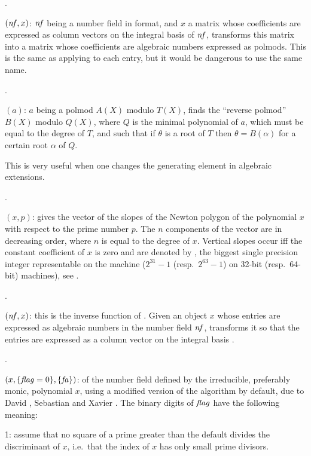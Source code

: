 .

$(\hbox{\it nf\/},x)$: $\hbox{\it nf\/}$ being a number field in
 format, and $x$ a matrix whose coefficients are expressed as
column vectors on the integral basis of $\hbox{\it nf\/}$, transforms this matrix
into a matrix whose coefficients are algebraic numbers expressed as
polmods. This is the same as applying  to each entry, but
it would be dangerous to use the same name.

.

$(a)$: $a$ being a polmod $A(X)$ modulo $T(X)$, finds
the ``reverse polmod'' $B(X)$ modulo $Q(X)$, where $Q$ is the minimal
polynomial of $a$, which must be equal to the degree of $T$, and such that if
$\theta$ is a root of $T$ then $\theta=B(\alpha)$ for a certain root $\alpha$
of $Q$.

This is very useful when one changes the generating element in algebraic
extensions.

.

$(x,p)$: gives the vector of the slopes of the Newton
polygon of the polynomial $x$ with respect to the prime number $p$. The $n$
components of the vector are in decreasing order, where $n$ is equal to the
degree of $x$. Vertical slopes occur iff the constant coefficient of $x$ is
zero and are denoted by , the biggest single precision
integer representable on the machine ($2^{31}-1$ (resp.~$2^{63}-1$) on 32-bit
(resp.~64-bit) machines), see .

.

$(\hbox{\it nf\/},x)$: this is the inverse function of
. Given an object $x$ whose entries are expressed as
algebraic numbers in the number field $\hbox{\it nf\/}$, transforms it so that the
entries are expressed as a column vector on the integral basis
.

.

$(x,\{\hbox{\it f\kern0pt lag\/}=0\},\{\hbox{\it fa\/}\})$:  of the number
field defined by the irreducible, preferably monic, polynomial $x$, using a
modified version of the  algorithm by default, due to David
, Sebastian  and Xavier . The binary digits
of $\hbox{\it f\kern0pt lag\/}$ have the following meaning:

1: assume that no square of a prime greater than the default 
divides the discriminant of $x$, i.e.~that the index of $x$ has only small
prime divisors.

